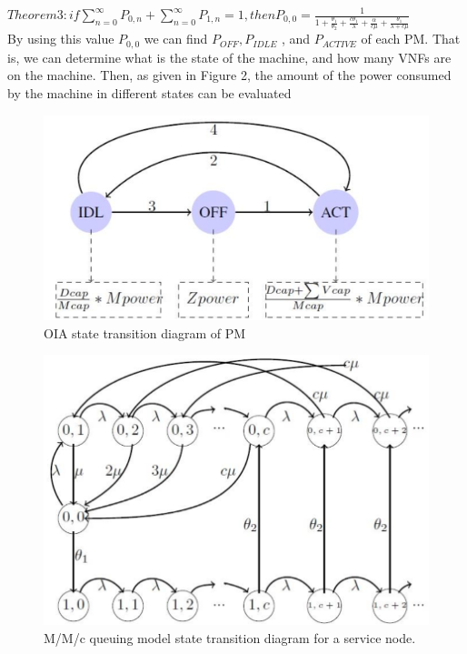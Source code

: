 \documentclass[12pt]{article}
\begin{document}
$Theorem 3: if \sum_{n=0}^{\infty}P_{0,n}+\sum_{n=0}^{\infty}P_{1,n}=1, then P_{0,0}=\frac{1}{1+\frac{\theta_1}{\theta_2}+\frac{c\theta_1}{\lambda}+\frac{\alpha}{c\mu}+\frac{\theta_1}{\lambda+c\mu}}$\\

By using this value $P_{0,0}$ we can find $P_{OFF},P_{IDLE}$ , and
$P_{ACTIVE}$ of each PM. That is, we can determine what is the
state of the machine, and how many VNFs are on the machine.
Then, as given in Figure 2, the amount of the power consumed
by the machine in different states can be evaluated
\begin{figure}[!t] \label{fig:2}
  \includegraphics[width=\linewidth]{fig2.png}
  \caption{OIA state transition diagram of PM}
\end{figure}
\begin{figure}[!t] \label{fig:3}
  \includegraphics[width=\linewidth]{fig3.png}
  \caption{M/M/c queuing model state transition diagram for a service node.}
\end{figure}
\end{document}
